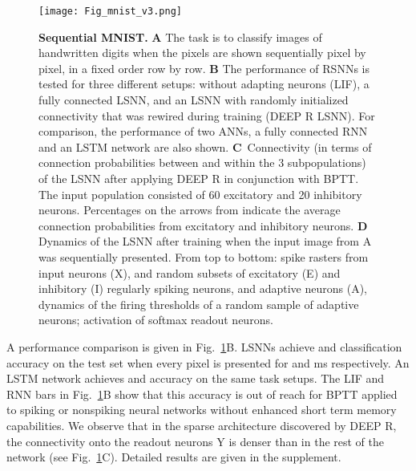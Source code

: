 \documentclass{article} \pdfoutput=1
\begin{document}
\begin{figure}
	\texttt{[image: Fig\_mnist\_v3.png]}
        \caption{\label{fig:mnist} \textbf{Sequential MNIST.}
          \textbf{A} The task is to classify images of
          handwritten digits when the pixels are shown sequentially pixel by pixel, in a fixed order
          row by row.  \textbf{B} The performance of RSNNs is tested for three different setups: without
          adapting neurons (LIF), a fully connected LSNN, and an LSNN with randomly
          initialized connectivity that was rewired during training (DEEP R LSNN).
          For comparison, the performance of two ANNs, a fully connected RNN and an LSTM network are also shown.
          \mbox{\textbf{C} Connectivity} (in terms of connection probabilities between and within the 3 subpopulations) of the LSNN after applying DEEP R in conjunction with BPTT.
          The input population  consisted of 60 excitatory and 20 inhibitory neurons.
          Percentages on the arrows from  indicate the average connection probabilities from excitatory and inhibitory neurons.
          \textbf{D} Dynamics of the LSNN after training when the input image from A was sequentially presented. From top to
          bottom: spike rasters from input neurons (X), and random subsets of excitatory (E) and inhibitory (I) regularly spiking neurons, and
          adaptive neurons (A), dynamics of the firing thresholds of a random sample of adaptive neurons; activation of softmax readout neurons.}
\end{figure}

A performance comparison is given in Fig.~\ref{fig:mnist}B. LSNNs achieve  and  classification accuracy on the test set when every pixel is presented for  and ms respectively.
An LSTM network achieves  and  accuracy on the same task setups.
The LIF and RNN bars in Fig.~\ref{fig:mnist}B show that this accuracy is out of reach for BPTT applied to spiking or nonspiking neural networks
without enhanced short term memory capabilities.
We observe that in the sparse architecture discovered by DEEP R, the
connectivity onto the readout neurons Y is denser than in the rest of the network (see Fig.~\ref{fig:mnist}C).
Detailed results are given in the supplement.
\end{document}
